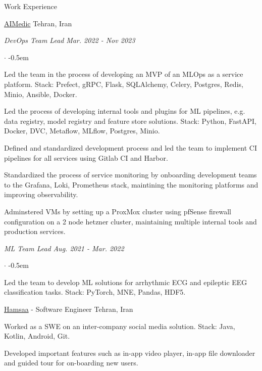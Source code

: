 \documentclass[../professional-cv.tex]{subfiles}
\begin{document}
\begin{rSection}{Work Experience}
	\begin{rWorkSection}
		{\href{https://aimedic.co/}{AIMedic}}
		{Tehran, Iran}

		\vspace{-1em}
		{\em DevOps Team Lead} \hfill {\em Mar. 2022 - Nov 2023} \hspace{10pt}
		\normalfont
		\begin{list}{$\cdot$}{\leftmargin=10pt\normalfont \rightmargin=20pt}
			\itemsep -0.5em
			\item Led the team in the process of developing an MVP of an MLOps as a service platform. Stack: Prefect, gRPC, Flask, SQLAlchemy, Celery, Postgres, Redis, Minio, Ansible, Docker.
			\item Led the process of developing internal tools and plugins for ML pipelines, e.g. data registry, model registry and feature store solutions. Stack: Python, FastAPI, Docker, DVC, Metaflow, MLflow, Postgres, Minio.
			\item Defined and standardized development process and led the team to implement CI pipelines for all services using Gitlab CI and Harbor.
			\item Standardized the process of service monitoring by onboarding development teams to the Grafana, Loki, Prometheus stack, maintining the monitoring platforms and improving observability.
			\item Adminstered VMs by setting up a ProxMox cluster using pfSense firewall configuration on a 2 node hetzner cluster, maintaining multiple internal tools and production services.
		\end{list}
		{\em ML Team Lead} \hfill {\em Aug. 2021 - Mar. 2022}
		\normalfont
		\begin{list}{$\cdot$}{\leftmargin=10pt\normalfont \rightmargin=20pt}
			\itemsep -0.5em
			\item Led the team to develop ML solutions for arrhythmic ECG and epileptic EEG classification tasks. Stack: PyTorch, MNE, Pandas, HDF5.
		\end{list}
	\end{rWorkSection}

	\begin{rSubsection}
		{\href{https://hamsaa.ir}{Hamsaa}}
		{  -  }
		{Software Engineer}
		{Tehran, Iran}
		\item Worked as a SWE on an inter-company social media solution. Stack: Java, Kotlin, Android, Git.
		\item Developed important features such as in-app video player, in-app file downloader and guided tour for on-boarding new users.

	\end{rSubsection}



\end{rSection}
\end{document}

